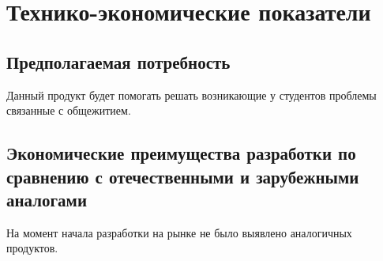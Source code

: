 \section{Технико-экономические показатели}

\subsection{Предполагаемая потребность}

Данный продукт будет помогать решать возникающие у студентов проблемы связанные с общежитием.

\subsection{Экономические преимущества разработки по сравнению с отечественными и зарубежными аналогами}

На момент начала разработки на рынке не было выявлено аналогичных продуктов.